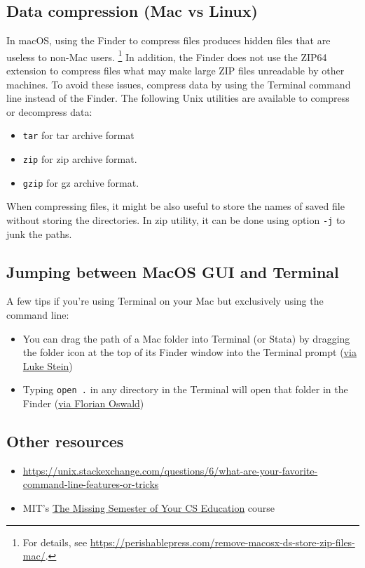 \subsection{Data compression (Mac vs Linux)}
In macOS, using the Finder to compress files produces hidden files that are useless to non-Mac users.%
\footnote{For details, see \url{https://perishablepress.com/remove-macosx-ds-store-zip-files-mac/}.}
In addition, the Finder does not use the ZIP64 extension to compress files what may make large ZIP files unreadable by other machines.
To avoid these issues, compress data by using the Terminal command line instead of the Finder.
The following Unix utilities are available to compress or decompress data:
\begin{itemize}
	\item \texttt{tar} for tar archive format
	\item \texttt{zip} for zip archive format.
	\item \texttt{gzip} for gz archive format.
\end{itemize}

When compressing files, it might be also useful to store the names of saved file without storing the directories.
In zip utility, it can be done using option \texttt{-j} to junk the paths.


\subsection{Jumping between MacOS GUI and Terminal}

A few tips if you're using Terminal on your Mac but exclusively using the command line:
\begin{itemize}
	\item You can drag the path of a Mac folder into Terminal (or Stata) by dragging the folder icon at the top of its Finder window into the Terminal prompt (\href{https://twitter.com/lukestein/status/1179792864630296578}{via Luke Stein})
	\item Typing \texttt{open .} in any directory in the Terminal will open that folder in the Finder (\href{https://twitter.com/FlorianOswald/status/1179779138892292096}{via Florian Oswald})
\end{itemize}

\subsection{Other resources}

\begin{itemize}
	\item \url{https://unix.stackexchange.com/questions/6/what-are-your-favorite-command-line-features-or-tricks}
	\item MIT's \href{https://missing.csail.mit.edu/}{The Missing Semester of Your CS Education} course
\end{itemize}
